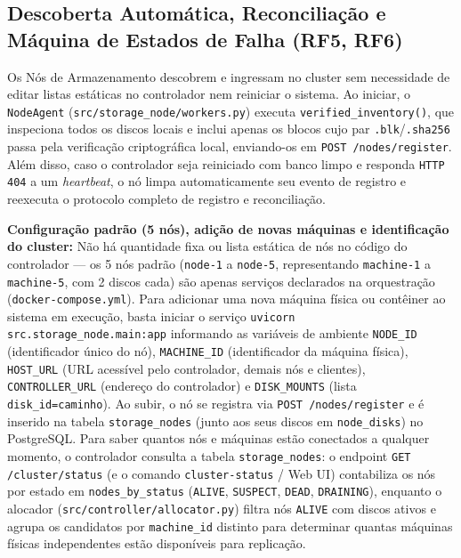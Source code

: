 \documentclass[10pt,a4paper]{article}
\begin{document}
\subsection{Descoberta Automática, Reconciliação e Máquina de Estados de Falha (RF5, RF6)}
Os Nós de Armazenamento descobrem e ingressam no cluster sem necessidade de editar listas estáticas no controlador nem reiniciar o sistema. Ao iniciar, o \texttt{NodeAgent} (\texttt{src/storage\_node/workers.py}) executa \texttt{verified\_inventory()}, que inspeciona todos os discos locais e inclui apenas os blocos cujo par \texttt{.blk}/\texttt{.sha256} passa pela verificação criptográfica local, enviando-os em \texttt{POST /nodes/register}. Além disso, caso o controlador seja reiniciado com banco limpo e responda \texttt{HTTP 404} a um \textit{heartbeat}, o nó limpa automaticamente seu evento de registro e reexecuta o protocolo completo de registro e reconciliação.

\textbf{Configuração padrão (5 nós), adição de novas máquinas e identificação do cluster:} Não há quantidade fixa ou lista estática de nós no código do controlador --- os 5 nós padrão (\texttt{node-1} a \texttt{node-5}, representando \texttt{machine-1} a \texttt{machine-5}, com 2 discos cada) são apenas serviços declarados na orquestração (\texttt{docker-compose.yml}). Para adicionar uma nova máquina física ou contêiner ao sistema em execução, basta iniciar o serviço \texttt{uvicorn src.storage\_node.main:app} informando as variáveis de ambiente \texttt{NODE\_ID} (identificador único do nó), \texttt{MACHINE\_ID} (identificador da máquina física), \texttt{HOST\_URL} (URL acessível pelo controlador, demais nós e clientes), \texttt{CONTROLLER\_URL} (endereço do controlador) e \texttt{DISK\_MOUNTS} (lista \texttt{disk\_id=caminho}). Ao subir, o nó se registra via \texttt{POST /nodes/register} e é inserido na tabela \texttt{storage\_nodes} (junto aos seus discos em \texttt{node\_disks}) no PostgreSQL. Para saber quantos nós e máquinas estão conectados a qualquer momento, o controlador consulta a tabela \texttt{storage\_nodes}: o endpoint \texttt{GET /cluster/status} (e o comando \texttt{cluster-status} / Web UI) contabiliza os nós por estado em \texttt{nodes\_by\_status} (\texttt{ALIVE}, \texttt{SUSPECT}, \texttt{DEAD}, \texttt{DRAINING}), enquanto o alocador (\texttt{src/controller/allocator.py}) filtra nós \texttt{ALIVE} com discos ativos e agrupa os candidatos por \texttt{machine\_id} distinto para determinar quantas máquinas físicas independentes estão disponíveis para replicação.
\end{document}
